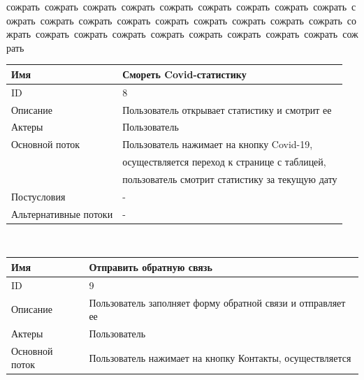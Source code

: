 \newpage
\BgThispage
\begin{flushright}
    \mbox{сожрать сожрать сожрать сожрать сожрать сожрать сожрать сожрать сожрать сожрать сожрать сожрать сожрать сожрать сожрать сожрать сожрать сожрать сожрать сожрать сожрать сожрать сожрать сожрать сожрать сожрать сожрать сожрать}
\end{flushright}
\begin{center}
    \small
    \begin{tabular}{|l|l|}
        \hline
        Имя                   & Смореть Covid-статистику                        \\
        \hline
        ID                    & 8                                               \\
        \hline
        Описание              & Пользователь открывает статистику и смотрит ее  \\
        \hline
        Актеры                & Пользователь                                    \\
        \hline
        Основной поток        & Пользователь нажимает на кнопку Covid-19,       \\
        & осуществляется переход к странице с таблицей,   \\
        & пользователь смотрит статистику за текущую дату \\
        \hline
        Постусловия           & -                                               \\
        \hline
        Альтернативные потоки & -                                               \\
        \hline
    \end{tabular}\\
    \vspace{0.5cm}
    \begin{tabular}{|l|l|}
        \hline
        Имя                   & Отправить обратную связь                                    \\
        \hline
        ID                    & 9                                                           \\
        \hline
        Описание              & Пользователь заполняет форму обратной связи и отправляет ее \\
        \hline
        Актеры                & Пользователь                                                \\
        \hline
        Основной поток        & Пользователь нажимает на кнопку Контакты, осуществляется    \\

\end{tabular}
\end{center}
